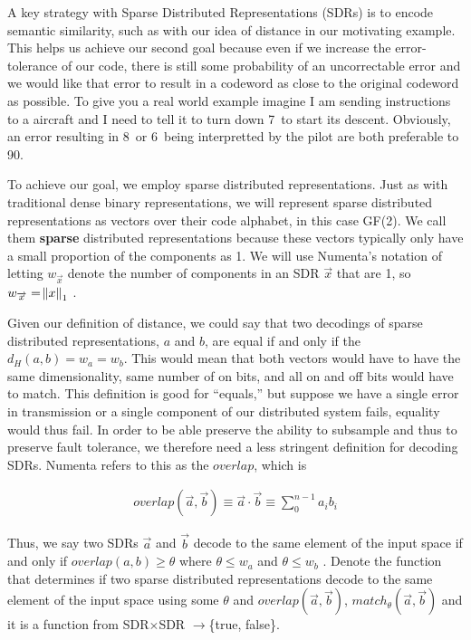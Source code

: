 \documentclass[oneside,12pt,openany]{book}
\begin{document}
	A key strategy with Sparse Distributed Representations (SDRs) is to encode semantic similarity, such as with our idea of distance in our motivating example. This helps us achieve our second goal because even if we increase the error-tolerance of our code, there is still some probability of an uncorrectable error and we would like that error to result in a codeword as close to the original codeword as possible. To give you a real world example imagine I am sending instructions to a aircraft and I need to tell it to turn down 7\textdegree~to start its descent. Obviously, an error resulting in 8\textdegree~or 6\textdegree~being interpretted by the pilot are both preferable to 90\textdegree.
	
	To achieve our goal, we employ sparse distributed representations. Just as with traditional dense binary representations, we will represent sparse distributed representations as vectors over their code alphabet, in this case GF(2). We call them \textbf{sparse} distributed representations because these vectors typically only have a small proportion of the components as 1. We will use Numenta's notation of letting $w_{\overrightarrow{x}}$ denote the number of components in an SDR $\overrightarrow{x}$ that are 1, so $w_{\overrightarrow{x}} = \norm{x}_{1}$ \cite{Properties}.
	
	Given our definition of distance, we could say that two decodings of sparse distributed representations, $a$ and $b$, are equal if and only if the $d_{H}(a,b) = w_{a} = w_{b}$. This would mean that both vectors would have to have the same dimensionality, same number of on bits, and all on and off bits would have to match. This definition is good for ``equals,'' but suppose we have a single error in transmission or a single component of our distributed system fails, equality would thus fail. In order to be able preserve the ability to subsample and thus to preserve fault tolerance, we therefore need a less stringent definition for decoding SDRs. Numenta refers to this as the $overlap$, which is 
	
	\begin{align}
	\label{eqn:overlap}
		overlap(\overrightarrow{a}, \overrightarrow{b}) \equiv \overrightarrow{a} \cdot \overrightarrow{b} \equiv \sum_{0}^{n-1} a_{i}b_{i}
	\end{align}
	
	
	 Thus, we say two SDRs $\overrightarrow{a}$ and $\overrightarrow{b}$ decode to the same element of the input space if and only if $overlap(a,b) \geq \theta$ where $\theta \leq w_{a}$ and $\theta \leq w_{b}$ \cite{Properties}. Denote the function that determines if two sparse distributed representations decode to the same element of the input space using some $\theta$ and $overlap(\overrightarrow{a}, \overrightarrow{b})$, $match_{\theta}(\overrightarrow{a}, \overrightarrow{b})$ and it is a function from SDR$\times$SDR $\longrightarrow$\{true, false\}.
	
\end{document}
